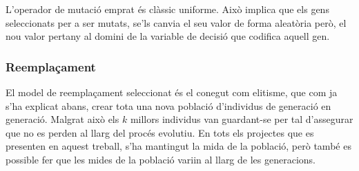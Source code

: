 L'operador de mutació emprat és clàssic uniforme. Això implica que els gens
seleccionats per a ser mutats, se'ls canvia el seu valor de forma aleatòria
però, el nou valor pertany al domini de la variable de decisió que codifica
aquell gen.

\subsubsection{Reemplaçament}

El model de reemplaçament seleccionat és el conegut com elitisme, que com ja
s'ha explicat abans, crear tota una nova població d'individus de generació en
generació. Malgrat això els $k$ millors individus van guardant-se per tal
d'assegurar que no es perden al llarg del procés evolutiu.  En tots els
projectes que es presenten en aquest treball, s'ha mantingut la mida de la
població, però també es possible fer que les mides de la població variin al
llarg de les generacions.




